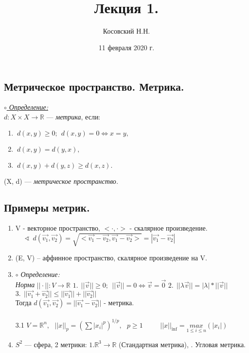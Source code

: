\documentclass{article}
\title{Лекция 1.}
\author{Косовский Н.Н.}
\date{11 февраля 2020 г.}
\begin{document}
 \begin{spacing}{1.5}
\maketitle
\newpage
     
    \tableofcontents
    \newpage
\section{Метрическое пространство. Метрика.}
\underline{\textit{$\circ$ Определение:}}\\

  $d: X \times X\rightarrow \mathbb{R}$ --- \emph{\textit{метрика}}, если:
 \begin{enumerate}
\item $~d\left( x, y\right)\geq 0;~~ d\left( x, y\right) = 0\Longleftrightarrow x=y ,$
\item $~d\left( x, y\right)=d\left( y, x\right) ,$
\item $~d\left( x, y\right)+d\left( y, z\right)\geq d(x, z) .$

\end{enumerate}
 (X, d) --- \textit{метрическое пространство.}
 \\
 \subsection{Примеры метрик.}

 \begin{enumerate}
\item V - векторное пространство, $<\cdot , \cdot >$ - скалярное произведение.
 \\$ ~~~~~~\sphericalangle ~~d(\vec{v_{1}}, \vec{v_{2}}) = \sqrt{<\vec{v_{1}} - \vec{v_{2}},\vec{v_{1}} - \vec{v_{2}}> } = |\vec{v_{1}} - \vec{v_{2}}|$
 \item (E, V) -- аффинное пространство, скалярное произведение на V.
 \item \emph{$\circ$ Определение:}\\
 \emph{Норма }$||\cdot||: V\rightarrow  \mathbb{R}$
 \subitem $1. ~~||\vec{v}||\geq 0 ; ~~||\vec{v}|| = 0 \Longleftrightarrow \vec{v} = \vec{0} $
 \subitem $ 2. ~~||\lambda\vec{v}|| = |\lambda|*||\vec{v}|| $
 \subitem $ 3.~~||\vec{v_{1}} + \vec{v_{2}} ||\leq || \vec{v_{1}} || + ||\vec{v_{2}}||$
 \\Тогда $d(\vec{v_{1}}, \vec{v_{2}}) = ||\vec{v_{1}} - \vec{v_{2}}||$ - метрика.
 \\ \\3.1 $V = \mathbb{R}^{n} ,~~~ ||x||_{p} = (\sum |x_{i}|^{p})^{1/p},~~~ p\geq 1$
 \subsubitem $~~~~~~~~~~||x||_{\inf}=\underset{1\leq i\leq n}{max}(|x_{i}|)$
 \item $S^{2}$ --- сфера, 2 метрики:
 \subsubitem $1. \mathbb{R}^{3}\rightarrow \mathbb{R}$ (Стандартная метрика),
 . Угловая метрика.
\end{enumerate}
\end{spacing}
\newpage
\end{document}
